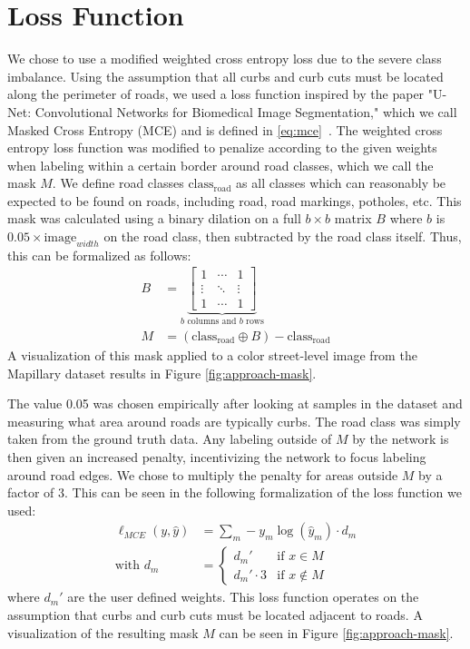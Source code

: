 \section{Loss Function}\label{section:approach-lossfunction}
We chose to use a modified weighted cross entropy loss due to the severe class imbalance.
Using the assumption that all curbs and curb cuts must be located along the perimeter of roads, we used a loss function inspired by the paper "U-Net: Convolutional Networks for Biomedical Image Segmentation," which we call Masked Cross Entropy (MCE) and is defined in \eqref{eq:mce}~\cite{unet}.
The weighted cross entropy loss function was modified to penalize according to the given weights when labeling within a certain border around road classes, which we call the mask $M$.
We define road classes $\text{class}_{\text{road}}$ as all classes which can reasonably be expected to be found on roads, including road, road markings, potholes, etc.
This mask was calculated using a binary dilation on a full $b \times b$ matrix $B$ where $b$ is $0.05 \times \text{image}_{width}$ on the road class, then subtracted by the road class itself.
Thus, this can be formalized as follows:
\begin{align}
	B &= \underbrace{
			\begin{bmatrix}
				1  & \cdots & 1\\ 
				\vdots &  \ddots & \vdots\\ 
				1 &  \cdots & 1
				\end{bmatrix}}_{b \text{ columns and } b \text{ rows}} \\
	M &= \left(\text{class}_{\text{road}} \oplus B\right) - \text{class}_{\text{road}}
\end{align}
A visualization of this mask applied to a color street-level image from the Mapillary dataset results in Figure \ref{fig:approach-mask}.


The value 0.05 was chosen empirically after looking at samples in the dataset and measuring what area around roads are typically curbs.
The road class was simply taken from the ground truth data.
Any labeling outside of $M$ by the network is then given an increased penalty, incentivizing the network to focus labeling around road edges.
We chose to multiply the penalty for areas outside $M$ by a factor of 3.
This can be seen in the following formalization of the loss function we used:
\begin{align}\label{eq:mce}
	\ell_{MCE}(y, \hat{y}) &=\sum_{m}-y_m\log(\hat{y}_m) \cdot d_m\\
	\text{with } d_m &= 
	\begin{cases}
	d_m' & \text{if } x \in M\\
	d_m' \cdot 3 & \text{if } x \notin M
	\end{cases}
\end{align}
where $d_m'$ are the user defined weights. 
This loss function operates on the assumption that curbs and curb cuts must be located adjacent to roads.
A visualization of the resulting mask $M$ can be seen in Figure \ref{fig:approach-mask}.
